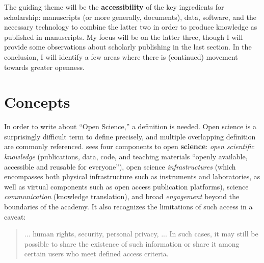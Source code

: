 \documentclass{article}
\begin{document}
The guiding theme will be the \textbf{accessibility} of the key ingredients for scholarship: manuscripts (or more generally, documents), data, software, and the necessary technology to combine the latter two in order to produce knowledge as published in manuscripts. My focus will be on the latter three, though I will provide some observations about scholarly publishing in the last section.
In the conclusion, I will identify a few areas where there is (continued) movement towards greater openness. 



\section{Concepts}

In order to write about ``Open Science,'' a definition is needed. Open science is a surprisingly difficult term to define precisely, and multiple overlapping definition are commonly referenced. 
%
\citet{unesco_understanding_2022} sees four components to open \textbf{science}: \textit{open   scientific   knowledge }(publications, data, code, and teaching materials ``openly    available, accessible and reusable for everyone''),     open     science     \textit{infrastructures} (which encompasses both physical infrastructure such as instruments and laboratories, as well as virtual components such as open access publication platforms),     science     \textit{communication} (knowledge translation),  and broad \textit{engagement} beyond the boundaries of the academy. It also recognizes the limitations of such access in a caveat: 

\begin{quote}

...  human rights, security, personal privacy, ... In such  cases,  it  may  still  be  possible  to  share  the  existence  of  such  information or share it among certain users who meet defined access criteria.
    
\end{quote}
\end{document}
